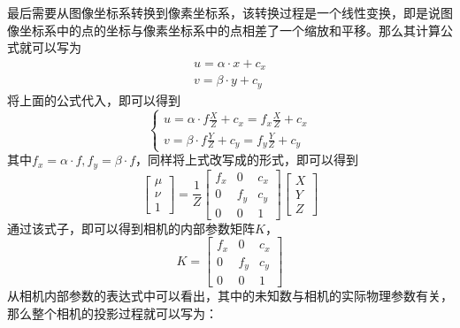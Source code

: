 最后需要从图像坐标系转换到像素坐标系，该转换过程是一个线性变换，即是说图像坐标系中的点的坐标与像素坐标系中的点相差了一个缩放和平移。那么其计算公式就可以写为
\begin{equation}
    \begin{array}{c}
        u = \alpha\cdot x+ c_x \\
        v = \beta \cdot y + c_y
    \end{array}
\end{equation}
将上面的公式代入，即可以得到
\begin{equation}
    \left\{\begin{array}{c}
        u = \alpha\cdot f\frac{X}{Z}+ c_x = f_x\frac{X}{Z}+ c_x \\
        v = \beta \cdot f\frac{Y}{Z} + c_y = f_y\frac{Y}{Z} + c_y
    \end{array}\right.
\end{equation}
其中\(f_x = \alpha \cdot f,f_y = \beta \cdot f\)，同样将上式改写成\qczb 的形式，即可以得到
\begin{equation}
    \left[\begin{array}{c}\mu\\\nu\\1\end{array}\right] = \frac{1}{Z}\left[
        \begin{array}{ccc}f_x&0&c_x\\0&f_y&c_y\\0&0&1\end{array}\right]\left[\begin{array}{c}X\\Y\\Z\end{array}\right]
\end{equation}
通过该式子，即可以得到相机的内部参数矩阵\(K\)，
\begin{equation}
    K=\left[
        \begin{array}{ccc}f_x&0&c_x\\0&f_y&c_y\\0&0&1\end{array}\right]
\end{equation}
从相机内部参数的表达式中可以看出，其中的未知数与相机的实际物理参数有关，那么整个相机的投影过程就可以写为：
